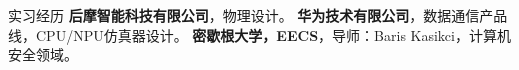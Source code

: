 \begin{rubric}{实习经历}
\entry*[2026.1 -- 至今]%
	\textbf{后摩智能科技有限公司}，物理设计。
%
\entry*[2023.9 -- 2024.7]%
	\textbf{华为技术有限公司}，数据通信产品线，CPU/NPU仿真器设计。
%
\entry*[2023.2 -- 2023.8]%
	\textbf{密歇根大学，EECS}，导师：Baris Kasikci，计算机安全领域。
%
\end{rubric}